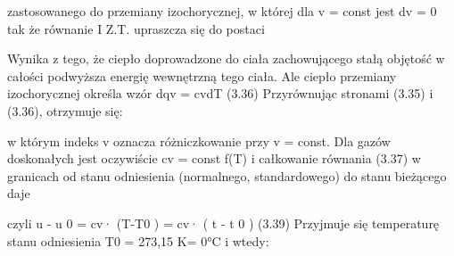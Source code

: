\documentclass[]{article}
\begin{document}
zastosowanego do przemiany izochorycznej, w której dla v = const jest dv
= 0 tak że równanie I Z.T. upraszcza się do postaci

Wynika z tego, że ciepło doprowadzone do ciała zachowującego stałą
objętość w całości podwyższa energię wewnętrzną tego ciała. Ale ciepło
przemiany izochorycznej określa wzór dqv = cvdT (3.36) Przyrównując
stronami (3.35) i (3.36), otrzymuje się:

w którym indeks v oznacza różniczkowanie przy v = const. Dla gazów
doskonałych jest oczywiście cv = const f(T) i całkowanie równania (3.37)
w granicach od stanu odniesienia (normalnego, standardowego) do stanu
bieżącego daje

czyli u - u 0 = cv· (T-T0 ) = cv· ( t - t 0 ) (3.39) Przyjmuje się
temperaturę stanu odniesienia T0 = 273,15 K= 0°C i wtedy:
\end{document}
